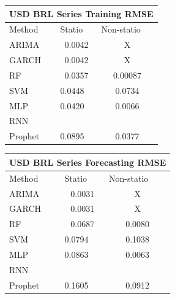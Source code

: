 \documentclass[10pt,twocolumn,letterpaper]{article}
\begin{document}
	\begin{table}[h]\label{table:usdbrltrainingRMSE}
		\centering
		\begin{tabular}{|lll|}
			\hline
			\multicolumn{3}{|c|}{USD BRL Series Training RMSE}                                                  \\ \hline
			\multicolumn{1}{|l|}{Method}  & \multicolumn{1}{l|}{Statio} & Non-statio             \\ \hline
			\multicolumn{1}{|l|}{ARIMA}   & \multicolumn{1}{c|}{0.0042}       & \multicolumn{1}{c|}{X} \\ \hline
			\multicolumn{1}{|l|}{GARCH}   & \multicolumn{1}{c|}{0.0042}       & \multicolumn{1}{c|}{X} \\ \hline
			\multicolumn{1}{|l|}{RF}      & \multicolumn{1}{c|}{0.0357}       & \multicolumn{1}{c|}{0.00087}  \\ \hline
			\multicolumn{1}{|l|}{SVM}     & \multicolumn{1}{l|}{0.0448}       & \multicolumn{1}{c|}{0.0734}  \\ \hline
			\multicolumn{1}{|l|}{MLP}     & \multicolumn{1}{l|}{0.0420}       & \multicolumn{1}{c|}{0.0066}  \\ \hline
			\multicolumn{1}{|l|}{RNN}     & \multicolumn{1}{l|}{}       & \multicolumn{1}{c|}{}  \\ \hline
			\multicolumn{1}{|l|}{Prophet} & \multicolumn{1}{l|}{0.0895}       & \multicolumn{1}{c|}{0.0377}  \\ \hline
		\end{tabular}
	\end{table}
	
	\begin{table}[h]
		\label{table:usdbrlforecastRMSE}
		\centering
		\begin{tabular}{|lll|}
			\hline
			\multicolumn{3}{|c|}{USD BRL Series Forecasting RMSE}                                                  \\ \hline
			\multicolumn{1}{|l|}{Method}  & \multicolumn{1}{l|}{Statio} & Non-statio             \\ \hline
			\multicolumn{1}{|l|}{ARIMA}   & \multicolumn{1}{c|}{0.0031}       & \multicolumn{1}{c|}{X} \\ \hline
			\multicolumn{1}{|l|}{GARCH}   & \multicolumn{1}{c|}{0.0031}       & \multicolumn{1}{c|}{X} \\ \hline
			\multicolumn{1}{|l|}{RF}      & \multicolumn{1}{c|}{0.0687}       & \multicolumn{1}{c|}{0.0080}  \\ \hline
			\multicolumn{1}{|l|}{SVM}     & \multicolumn{1}{l|}{0.0794}       & \multicolumn{1}{c|}{0.1038}  \\ \hline
			\multicolumn{1}{|l|}{MLP}     & \multicolumn{1}{l|}{0.0863}       & \multicolumn{1}{c|}{0.0063}  \\ \hline
			\multicolumn{1}{|l|}{RNN}     & \multicolumn{1}{l|}{}       & \multicolumn{1}{c|}{}  \\ \hline
			\multicolumn{1}{|l|}{Prophet} & \multicolumn{1}{l|}{0.1605}       & \multicolumn{1}{c|}{0.0912}  \\ \hline
		\end{tabular}
	\end{table}
	
\end{document}
